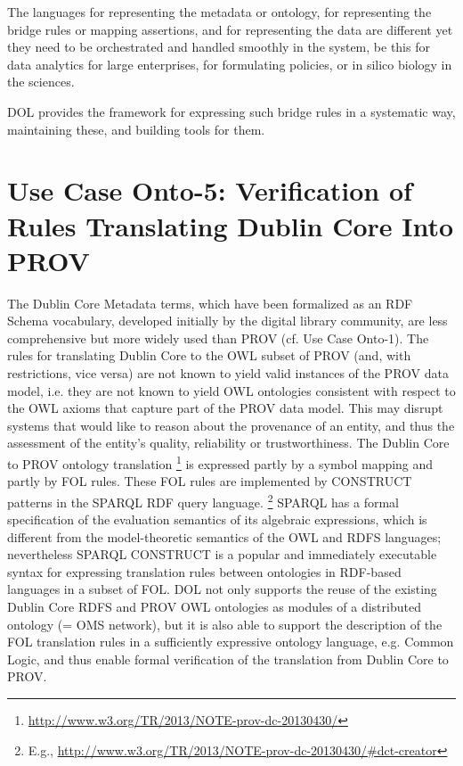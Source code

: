 \documentclass[10pt,fleqn,%
\ifpretendfinal
final%
\else
draft%
\fi,
]{scrreprt}
\begin{document}
The languages for representing the metadata or ontology, for representing the bridge rules or mapping assertions, and for representing the data are different yet 
they need to be orchestrated and handled smoothly in the system, be this for data analytics for large enterprises, for formulating policies, or in silico biology in the 
sciences. 

DOL  provides the framework for expressing such bridge rules in a systematic way, maintaining these, and building tools for them. 


\section{Use Case Onto-5: Verification of Rules Translating Dublin Core Into PROV}
The Dublin Core Metadata terms, which have been formalized as an RDF Schema vocabulary, developed initially by the digital library community, are less 
comprehensive but more widely used than PROV (cf. Use Case Onto-1). The rules for translating Dublin Core to the OWL subset of PROV (and, with restrictions, 
vice versa) are not known to yield valid instances of the PROV data model, i.e. they are not known to yield OWL ontologies consistent with respect to the OWL axioms that 
capture part of the PROV data model. This may disrupt systems that would like to reason about the provenance of an entity, and thus the assessment of the 
entity's quality, reliability or trustworthiness.
The Dublin Core to PROV ontology translation%
\footnote{\url{http://www.w3.org/TR/2013/NOTE-prov-dc-20130430/}}
  is expressed partly by a symbol mapping and partly by FOL rules. These FOL rules are implemented by CONSTRUCT patterns in the SPARQL RDF query language.%
\footnote{E.g., \url{http://www.w3.org/TR/2013/NOTE-prov-dc-20130430/\#dct-creator}} 
SPARQL has a formal specification of the evaluation semantics of its algebraic expressions, which is different from the model-theoretic semantics of the OWL and RDFS languages; nevertheless SPARQL CONSTRUCT is a popular and immediately executable syntax for expressing translation rules between ontologies in RDF-based languages in a subset of FOL.
DOL  not only supports the reuse of the existing Dublin Core RDFS and PROV OWL ontologies as modules of a distributed ontology (= OMS network), but it is also able to support the description of the FOL translation rules in a sufficiently expressive ontology language, e.g. Common Logic, and thus enable formal verification of the translation from Dublin Core to PROV.
\end{document}
